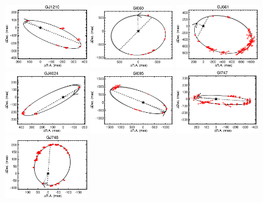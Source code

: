 \documentclass[twocolumn]{aastex62}
\begin{document}
\begin{figure}[htp]
\begin{center}
\includegraphics[width=0.32\textwidth]{Orbits/GJ1210AB.eps}
\includegraphics[width=0.32\textwidth]{Orbits/Gl660AB.eps}
\includegraphics[width=0.32\textwidth]{Orbits/GJ661AB.eps}
\includegraphics[width=0.32\textwidth]{Orbits/GJ4024AB.eps}
\includegraphics[width=0.32\textwidth]{Orbits/Gl695AB.eps}
\includegraphics[width=0.32\textwidth]{Orbits/Gl747AB.eps}
\includegraphics[width=0.32\textwidth]{Orbits/GJ748AB.eps}

\end{center}
\end{figure}
\end{document}
